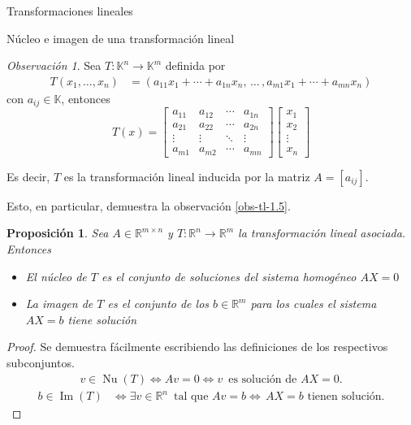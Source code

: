 \documentclass[a4paper,12pt,twoside,spanish,reqno]{amsbook}
\numberwithin{equation}{section}
\newtheorem{proposicion}[teorema]{Proposici\'on}
\theoremstyle{definition}
\theoremstyle{remark}
\newtheorem{observacion}[teorema]{Observaci\'on}
\newcommand\im{\operatorname{Im}}
\renewcommand\nu{\operatorname{Nu}}
\newcommand{\R}{\mathbb R}
\newcommand{\K}{\mathbb K}
\begin{document}
\begin{chapter}{Transformaciones lineales}
\begin{section}{Núcleo e imagen de una transformación lineal}
\begin{observacion}\label{obs-nu-im} 	Sea $T: \K^n \to \K^m$ definida por
    \begin{align*}
    T(x_1,\ldots,x_n) &= (a_{11}x_1+\cdots + a_{1n}x_n,\, \ldots\,,a_{m1}x_1+\cdots + a_{mn}x_n )
    \end{align*}
    con $a_{ij} \in \K$, entonces 
    \begin{equation*}
        T(x) = \begin{bmatrix*}
            a_{11}& a_{12} & \cdots &a_{1n} \\
            a_{21}& a_{22} & \cdots &a_{2n} \\
            \vdots&\vdots&\ddots&\vdots \\
            a_{m1}& a_{m2} & \cdots &a_{mn}
        \end{bmatrix*}
        \begin{bmatrix}
            x_1 \\ x_2 \\ \vdots \\ x_n
        \end{bmatrix}
    \end{equation*} 

    Es decir,  $T$ es la transformación lineal inducida por la matriz $A = [a_{ij}]$. 
 
    Esto, en particular,  demuestra la observación  \ref{obs-tl-1.5}.
\end{observacion}



\begin{proposicion}

    Sea $A\in\R^{m\times n}$ y $T:\R^n\longrightarrow\R^m$ la transformación lineal asociada. Entonces
    \begin{itemize}
     \item El núcleo de $T$ es el conjunto de soluciones del sistema homogéneo $AX=0$
     
     \item La imagen de $T$ es el conjunto de los $b\in\R^m$ para los cuales el sistema $AX=b$ tiene solución
    \end{itemize}
    \end{proposicion}
    \begin{proof}
        
   
    Se demuestra fácilmente escribiendo las definiciones de los respectivos subconjuntos.
    \begin{align*}
    v\in\nu(T)\Leftrightarrow Av=0\Leftrightarrow v\,\mbox{ es solución de $AX=0$.}
    \end{align*}
    \begin{align*}
    b\in\im(T)&\Leftrightarrow\exists v\in\R^n\,\mbox{ tal que } Av=b 
    \Leftrightarrow\,\mbox{$AX=b$ tienen solución}.
    \end{align*}
\end{proof}
    

\end{section}
\end{chapter}
\end{document}
